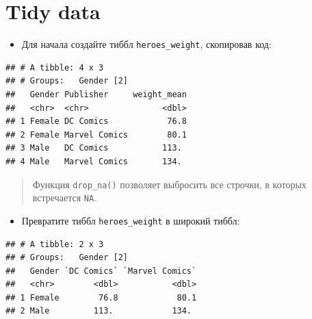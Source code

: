 \documentclass[]{book}
\newenvironment{Shaded}{\begin{snugshade}}{\end{snugshade}}
\newcommand{\KeywordTok}[1]{\textcolor[rgb]{0.13,0.29,0.53}{\textbf{#1}}}
\newcommand{\DataTypeTok}[1]{\textcolor[rgb]{0.13,0.29,0.53}{#1}}
\newcommand{\StringTok}[1]{\textcolor[rgb]{0.31,0.60,0.02}{#1}}
\newcommand{\OtherTok}[1]{\textcolor[rgb]{0.56,0.35,0.01}{#1}}
\newcommand{\OperatorTok}[1]{\textcolor[rgb]{0.81,0.36,0.00}{\textbf{#1}}}
\newcommand{\NormalTok}[1]{#1}
\providecommand{\tightlist}{%
  \setlength{\itemsep}{0pt}\setlength{\parskip}{0pt}}
\begin{document}
\section{Tidy data}\label{task_join}

\begin{itemize}
\tightlist
\item
  Для начала создайте тиббл \texttt{heroes\_weight}, скопировав код:
\end{itemize}

\begin{Shaded}
\end{Shaded}

\begin{verbatim}
## # A tibble: 4 x 3
## # Groups:   Gender [2]
##   Gender Publisher     weight_mean
##   <chr>  <chr>               <dbl>
## 1 Female DC Comics            76.8
## 2 Female Marvel Comics        80.1
## 3 Male   DC Comics           113. 
## 4 Male   Marvel Comics       134.
\end{verbatim}

\begin{quote}
Функция \texttt{drop\_na()} позволяет выбросить все строчки, в которых
встречается \texttt{NA}.
\end{quote}

\begin{itemize}
\tightlist
\item
  Превратите тиббл \texttt{heroes\_weight} в широкий тиббл:
\end{itemize}

\begin{verbatim}
## # A tibble: 2 x 3
## # Groups:   Gender [2]
##   Gender `DC Comics` `Marvel Comics`
##   <chr>        <dbl>           <dbl>
## 1 Female        76.8            80.1
## 2 Male         113.            134.
\end{verbatim}
\end{document}
